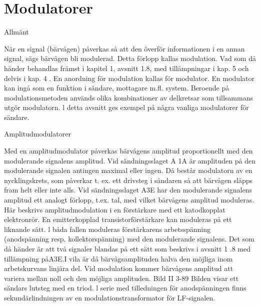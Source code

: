 \section{Modulatorer}
Allmänt

När en signal (bärvågen) påverkas så att
den överför informationen i en annan signal,
sägs bärvågen bli modulerad. Detta förlopp
kallas modulation. Vad som då händer behandlas främst i kapitel 1, avsnitt 1.8, med
tillämpningar i kap. 5 och delvis i kap. 4 .
En anordning för modulation kallas för
modulator. En modulator kan ingå som en
funktion i sändare, mottagare m.fl. system.
Beroende på modulationsmetoden används
olika kombinationer av delkretsar som tillsammans utgör modulatorn.
l detta avsnitt ges exempel på några
vanliga modulatorer för sändare.

Amplitudmodulatorer

Med en amplitudmodulator påverkas bärvågens amplitud proportionellt med den modulerande signalens amplitud.
Vid sändningsslaget A 1A är amplituden
på den modulerande signalen antingen maximal eller ingen. Då består modulatorn av en
nycklingskrets, som påverkar t. ex. ett drivsteg i sändaren så att bärvågen släpps fram
helt eller inte alls.
Vid sändningsslaget A3E har den modulerande signalens amplitud ett analogt förlopp, t.ex. tal, med vilket bärvågens amplitud moduleras. Här beskrivs amplitudmodulation i en förstärkare med ett katodkopplat
elektronrör. En emitterkopplad transistorförstärkare kan moduleras på ett liknande
sätt. l båda fallen moduleras förstärkarens
arbetsspänning (anodspänning resp. kollektorspänning) med den modulerande signalens. Det som då händer är att två signaler
blandas på ett sätt som beskrivs i avsnitt 1 .8
med tillämpning påA3E.I vila är då bärvågsamplituden halva den möjliga inom arbetskurvans linjära del. Vid modulation kommer
bärvågens amplitud att variera mellan noll
och den möjliga amplituden.
Bild II 3-89
Bilden visar ett sändars lutsteg med en triod.
l serie med tilledningen för anodspänningen
finns sekundärlindningen av en modulationstransformator för LF-signalen.

